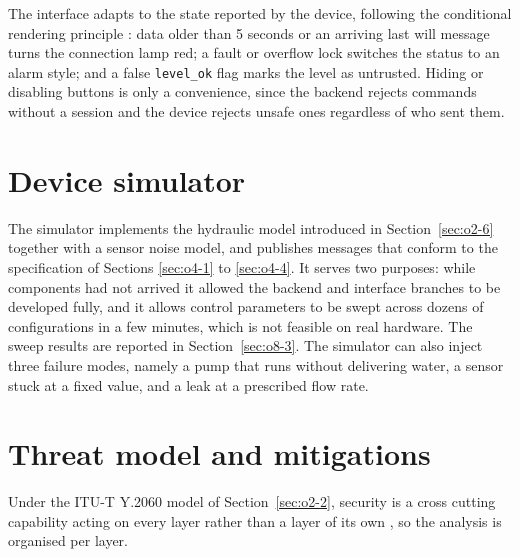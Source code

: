 The interface adapts to the state reported by the device, following the conditional rendering principle \cite{slide06}: data older than 5 seconds or an arriving last will message turns the connection lamp red; a fault or overflow lock switches the status to an alarm style; and a false \texttt{level\_ok} flag marks the level as untrusted. Hiding or disabling buttons is only a convenience, since the backend rejects commands without a session and the device rejects unsafe ones regardless of who sent them.

\section{Device simulator}
\label{sec:o5-4}

The simulator implements the hydraulic model introduced in Section~\ref{sec:o2-6} together with a sensor noise model, and publishes messages that conform to the specification of Sections \ref{sec:o4-1} to \ref{sec:o4-4}. It serves two purposes: while components had not arrived it allowed the backend and interface branches to be developed fully, and it allows control parameters to be swept across dozens of configurations in a few minutes, which is not feasible on real hardware. The sweep results are reported in Section~\ref{sec:o8-3}. The simulator can also inject three failure modes, namely a pump that runs without delivering water, a sensor stuck at a fixed value, and a leak at a prescribed flow rate.


\section{Threat model and mitigations}
\label{sec:o7-1}

Under the ITU-T Y.2060 model of Section~\ref{sec:o2-2}, security is a cross cutting capability acting on every layer rather than a layer of its own \cite{itu2060}, so the analysis is organised per layer.

